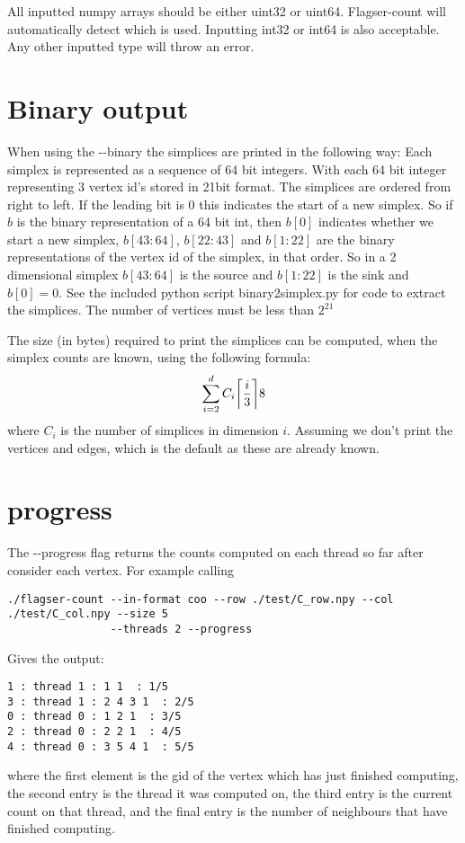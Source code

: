 \documentclass{amsart}
\theoremstyle{definition}
\let\originalleft\left
\let\originalright\right
\renewcommand{\left}{\mathopen{}\mathclose\bgroup\originalleft}
\renewcommand{\right}{\aftergroup\egroup\originalright}
\begin{document}
All inputted numpy arrays should be either uint32 or uint64. Flagser-count will automatically detect which is used. Inputting int32 or int64 is also acceptable. Any other inputted type will throw an error.
\section{Binary output}
When using the -{}-binary the simplices are printed in the following way: Each simplex is represented as a sequence of 64 bit integers. With each 64 bit integer representing 3 vertex id's stored in 21bit format. The simplices are ordered from right to left. If the leading bit is 0 this indicates the start of a new simplex. So if $b$ is the binary representation of a 64 bit int, then $b[0]$ indicates whether we start a new simplex, $b[43:64]$, $b[22:43]$ and $b[1:22]$ are the binary representations of the vertex id of the simplex, in that order. So in a 2 dimensional simplex $b[43:64]$ is the source and $b[1:22]$ is the sink and $b[0]=0$. See the included python script binary2simplex.py for code to extract the simplices. The number of vertices must be less than $2^{21}$

The size (in bytes) required to print the simplices can be computed, when the simplex counts are known, using the following formula:
$$ \sum_{i=2}^{d}C_i\left\lceil\frac{i}{3}\right\rceil8$$
where $C_i$ is the number of simplices in dimension $i$. Assuming we don't print the vertices and edges, which is the default as these are already known.


\section{progress}
The -{}-progress flag returns the counts computed on each thread so far after consider each vertex.
For example calling \begin{verbatim}
./flagser-count --in-format coo --row ./test/C_row.npy --col ./test/C_col.npy --size 5 
                --threads 2 --progress 
\end{verbatim}
Gives the output:
\begin{verbatim}
1 : thread 1 : 1 1  : 1/5
3 : thread 1 : 2 4 3 1  : 2/5
0 : thread 0 : 1 2 1  : 3/5
2 : thread 0 : 2 2 1  : 4/5
4 : thread 0 : 3 5 4 1  : 5/5
\end{verbatim}
where the first element is the gid of the vertex which has just finished computing, the second entry is the thread it was computed on, the third entry is the current count on that thread, and the final entry is the number of neighbours that have finished computing. 
\end{document}
